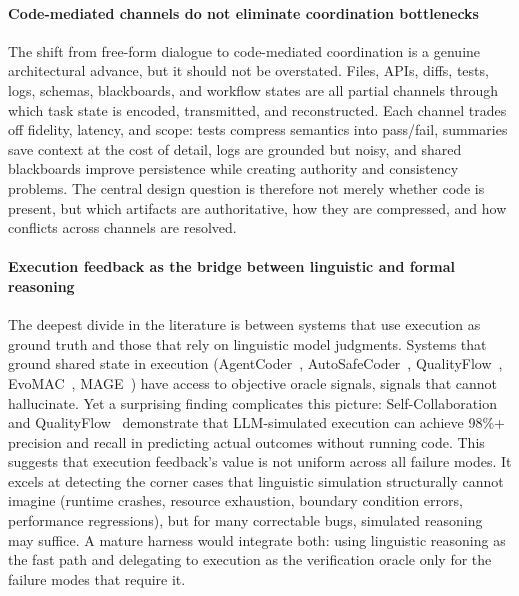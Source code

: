 \documentclass{llmxive}
\begin{document}
\paragraph{Code-mediated channels do not eliminate coordination bottlenecks}
{The shift from free-form dialogue to code-mediated
coordination is a genuine architectural advance, but it should
not be overstated. Files, APIs, diffs, tests, logs, schemas,
blackboards, and workflow states are all partial channels
through which task state is encoded, transmitted, and
reconstructed. Each channel trades off fidelity, latency, and
scope: tests compress semantics into pass/fail, summaries save
context at the cost of detail, logs are grounded but noisy, and
shared blackboards improve persistence while creating authority
and consistency problems. The central design question is
therefore not merely whether code is present, but which
artifacts are authoritative, how they are compressed, and how
conflicts across channels are resolved.}

\paragraph{Execution feedback as the bridge between linguistic and formal reasoning}
The deepest divide in the literature is between systems that use
execution as ground truth and those that rely on linguistic model
judgments. Systems that ground shared state in execution
(AgentCoder~\cite{huang2023agentcoder},
AutoSafeCoder~\cite{Nunez2024AutoSafeCoder},
QualityFlow~\cite{Hu2025QualityFlow}, EvoMAC~\cite{Hu2025EvoMAC},
MAGE~\cite{Zhao2024MAGE}) have access to objective oracle
signals, signals that cannot hallucinate. Yet a surprising
finding complicates this picture:
Self-Collaboration~\cite{Dong2024SelfCollaboration} and
QualityFlow~\cite{Hu2025QualityFlow} demonstrate that
LLM-simulated execution can achieve 98\%+ precision and recall in
predicting actual outcomes without running code. This suggests
that execution feedback's value is not uniform across all failure
modes. It excels at detecting the corner cases that linguistic
simulation structurally cannot imagine (runtime crashes, resource
exhaustion, boundary condition errors, performance regressions),
but for many correctable bugs, simulated reasoning may suffice. A
mature harness would integrate both: using linguistic reasoning
as the fast path and delegating to execution as the verification
oracle only for the failure modes that require it.
\end{document}
